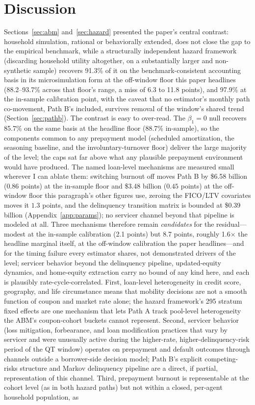 \documentclass[12pt]{article}
\begin{document}
\section{Discussion}\label{sec:discussion}

Sections~\ref{sec:abm} and~\ref{sec:hazard} presented the paper's central contrast: household simulation, rational or behaviorally extended, does not close the gap to the empirical benchmark, while a structurally independent hazard framework (discarding household utility altogether, on a substantially larger and non-synthetic sample) recovers 91.3\% of it on the benchmark-consistent accounting basis in its microsimulation form at the off-window floor this paper headlines (88.2--93.7\% across that floor's range, a miss of 6.3 to 11.8 points), and 97.9\% at the in-sample calibration point, with the caveat that no estimator's monthly path co-movement, Path B's included, survives removal of the window's shared trend (Section~\ref{sec:pathb}). The contrast is easy to over-read. The $\beta_1 = 0$ null recovers 85.7\% on the same basis at the headline floor (88.7\% in-sample), so the components common to any prepayment model (scheduled amortization, the seasoning baseline, and the involuntary-turnover floor) deliver the large majority of the level; the caps sat far above what any plausible prepayment environment would have produced. The named loan-level mechanisms are measured small wherever I can ablate them: switching burnout off moves Path B by \$6.58 billion ($0.86$ points) at the in-sample floor and \$3.48 billion ($0.45$ points) at the off-window floor this paragraph's other figures use, zeroing the FICO/LTV covariates moves it $1.3$ points, and the delinquency transition matrix is bounded at \$0.39 billion (Appendix~\ref{app:params}); no servicer channel beyond that pipeline is modeled at all. Three mechanisms therefore remain \emph{candidates} for the residual---modest at the in-sample calibration (2.1 points) but 8.7 points, roughly 1.6$\times$ the headline marginal itself, at the off-window calibration the paper headlines---and for the timing failure every estimator shares, not demonstrated drivers of the level; servicer behavior beyond the delinquency pipeline, updated-equity dynamics, and home-equity extraction carry no bound of any kind here, and each is plausibly rate-cycle-correlated. First, loan-level heterogeneity in credit score, geography, and life circumstance means that mobility decisions are not a smooth function of coupon and market rate alone; the hazard framework's 295 stratum fixed effects are one mechanism that lets Path A track pool-level heterogeneity the ABM's coupon-cohort buckets cannot represent. Second, servicer behavior (loss mitigation, forbearance, and loan modification practices that vary by servicer and were unusually active during the higher-rate, higher-delinquency-risk period of the QT window) operates on prepayment and default outcomes through channels outside a borrower-side decision model; Path B's explicit competing-risks structure and Markov delinquency pipeline are a direct, if partial, representation of this channel. Third, prepayment burnout is representable at the cohort level (as in both hazard paths) but not within a closed, per-agent household population, as 
\end{document}
